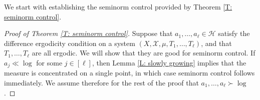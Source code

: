 \documentclass[11pt]{amsart}
\theoremstyle{definition}
\newcommand{\CH}{{\mathcal H}}
\newcommand{\CX}{{\mathcal X}}
\newcommand{\1}{{\mathbf{1}}}
\begin{document}
We start with establishing the seminorm control provided by Theorem \ref{T: seminorm control}.

\begin{proof}[Proof of Theorem \ref{T: seminorm control}]
Suppose that $a_{1},\dots,a_{\ell}\in\CH$ satisfy the difference ergodicity condition on a system $(X, \CX, \mu, T_1, \ldots, T_\ell)$, and that $T_1, \ldots, T_\ell$ are all ergodic. We will show that they are good for seminorm control. If $a_j\ll \log$ for some $j\in[\ell]$, then Lemma \ref{L: slowly growing} implies that the measure is concentrated on a single point, in which case seminorm control follows immediately. We assume therefore for the rest of the proof that $a_1, \ldots, a_\ell\succ \log$.



\end{proof}
\end{document}
